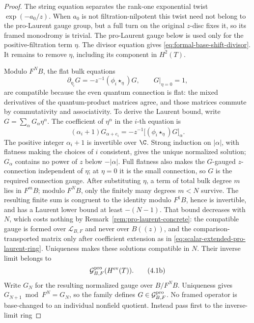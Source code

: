 \begin{proof}
The string equation separates the rank-one exponential twist
\(\exp(-a_0/z)\).  When \(a_0\) is not filtration-nilpotent this twist need
not belong to the pro-Laurent gauge group, but a full turn on the original
\(z\)-disc fixes it, so its framed monodromy is trivial.  The pro-Laurent
gauge below is used only for the positive-filtration term \(\eta\).  The
divisor equation gives \eqref{eq:formal-base-shift-divisor}.  It remains to
remove \(\eta\), including its component
in \(H^2(T)\).

Modulo \(F^N B\), the flat bulk equations
\[
 \partial_{\eta_i}G=-z^{-1}(\phi_i\star_\eta)G,
 \qquad G|_{\eta=0}=1,
\]
are compatible because the even quantum connection is flat: the mixed
derivatives of the quantum-product matrices agree, and those matrices commute
by commutativity and associativity.  To derive the Laurent bound, write
\(G=\sum_\alpha G_\alpha\eta^\alpha\).  The coefficient of
\(\eta^\alpha\) in the \(i\)-th equation is
\[
 (\alpha_i+1)G_{\alpha+e_i}
 =-z^{-1}\bigl[(\phi_i\star_\eta)G\bigr]_\alpha.
 \tag{4.1a}
 \label{eq:formal-base-shift-recursion}
\]
The positive integer \(\alpha_i+1\) is invertible over \(\C\).  Strong
induction on \(|\alpha|\), with flatness making the choices of \(i\)
consistent, gives the unique normalized solution; \(G_\alpha\) contains no
power of \(z\) below \(-|\alpha|\).  Full flatness also makes the
\(G\)-gauged \(z\)-connection independent of \(\eta\); at \(\eta=0\) it is
the small connection, so \(G\) is the required connection gauge.
After substituting \(\eta\), a
term of total bulk degree \(m\) lies in \(F^mB\); modulo \(F^NB\), only the
finitely many degrees \(m<N\) survive.  The resulting finite sum is congruent
to the identity modulo \(F^1B\), hence is invertible, and has a Laurent lower
bound at least \(-(N-1)\).  That bound decreases with \(N\), which costs
nothing by Remark~\ref{rem:pro-laurent-concrete}: the compatible gauge is
formed over \(\mathscr L_{B,F}\) and never over \(B((z))\), and the
comparison-transported matrix only after coefficient extension as in
\eqref{eq:scalar-extended-pro-laurent-ring}.  Uniqueness makes
these solutions compatible in \(N\).  Their inverse limit belongs to
\[
 \mathcal G^{\rm pro}_{B,F}(H^{\rm ev}(T)).
 \tag{4.1b}
\]
Write \(G_N\) for the resulting normalized gauge over \(B/F^NB\).
Uniqueness gives \(G_{N+1}\bmod F^N=G_N\), so the family defines
\(G\in\mathcal G^{\rm pro}_{B,F}\).  No framed operator is base-changed to an
individual nonfield quotient.  Instead pass first to the inverse-limit ring

\end{proof}
